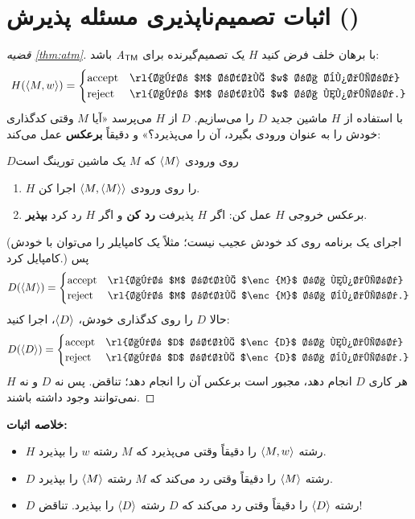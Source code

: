 \section{اثبات تصمیم‌ناپذیری مسئله پذیرش ()}

\begin{proof}[قضیه \ref{thm:atm}]
با برهان خلف فرض کنید $H$ یک تصمیم‌گیرنده برای $\mathit{A}_{\mathsf{TM}}$ باشد:
\[H(\enc{M,w})=\begin{cases}\text{accept} & \text{\rl{اگر $M$ رشته $w$ را بپذیرد}}\\ \text{reject} & \text{\rl{اگر $M$ رشته $w$ را نپذیرد.}}\end{cases}\]
با استفاده از $H$ ماشین جدید $D$ را می‌سازیم. $D$ از $H$ می‌پرسد «آیا $M$ وقتی کدگذاری خودش را به عنوان ورودی بگیرد، آن را می‌پذیرد؟» و دقیقاً \textbf{برعکس} عمل می‌کند:
\begin{algo}{$D$}{روی ورودی $\langle M\rangle$ که $M$ یک ماشین تورینگ است}
\begin{enumerate}
\item $H$ را روی ورودی $\langle M,\langle M\rangle\rangle$ اجرا کن.
\item برعکس خروجی $H$ عمل کن: اگر $H$ پذیرفت \textbf{رد کن} و اگر $H$ رد کرد \textbf{بپذیر}.
\end{enumerate}
\end{algo}
(اجرای یک برنامه روی کد خودش عجیب نیست؛ مثلاً یک کامپایلر را می‌توان با خودش کامپایل کرد.) پس
\[D(\enc{M})=\begin{cases}\text{accept} & \text{\rl{اگر $M$ رشته $\enc{M}$ را نپذیرد}}\\ \text{reject} & \text{\rl{اگر $M$ رشته $\enc{M}$ را بپذیرد.}}\end{cases}\]
حالا $D$ را روی کدگذاری خودش، $\langle D\rangle$، اجرا کنید:
\[D(\enc{D})=\begin{cases}\text{accept} & \text{\rl{اگر $D$ رشته $\enc{D}$ را نپذیرد}}\\ \text{reject} & \text{\rl{اگر $D$ رشته $\enc{D}$ را بپذیرد.}}\end{cases}\]
هر کاری $D$ انجام دهد، مجبور است برعکس آن را انجام دهد؛ تناقض. پس نه $D$ و نه $H$ نمی‌توانند وجود داشته باشند.
\end{proof}

\textbf{خلاصه اثبات:}
\begin{itemize}
\item $H$ رشته $\langle M,w\rangle$ را دقیقاً وقتی می‌پذیرد که $M$ رشته $w$ را بپذیرد.
\item $D$ رشته $\langle M\rangle$ را دقیقاً وقتی رد می‌کند که $M$ رشته $\langle M\rangle$ را بپذیرد.
\item $D$ رشته $\langle D\rangle$ را دقیقاً وقتی رد می‌کند که $D$ رشته $\langle D\rangle$ را بپذیرد. تناقض!
\end{itemize}

